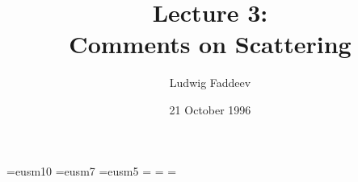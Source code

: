 
\font\teneusm=eusm10  \font\seveneusm=eusm7 
\font\fiveeusm=eusm5 
\newfam\eusmfam 
\textfont\eusmfam=\teneusm 
\scriptfont\eusmfam=\seveneusm 
\scriptscriptfont\eusmfam=\fiveeusm 
\def\Scr#1{{\fam\eusmfam\relax#1}}

\newcommand{\ScrA}{{\Scr A}} \newcommand{\ScrB}{{\Scr B}}
\newcommand{\ScrC}{{\Scr C}} \newcommand{\ScrD}{{\Scr D}}
\newcommand{\ScrE}{{\Scr E}} \newcommand{\ScrF}{{\Scr F}}
\newcommand{\ScrG}{{\Scr G}} \newcommand{\ScrH}{{\Scr H}}
\newcommand{\ScrI}{{\Scr I}} \newcommand{\ScrJ}{{\Scr J}}
\newcommand{\ScrK}{{\Scr K}} \newcommand{\ScrL}{{\Scr L}}
\newcommand{\ScrM}{{\Scr M}} \newcommand{\ScrN}{{\Scr N}}
\newcommand{\ScrO}{{\Scr O}} \newcommand{\ScrP}{{\Scr P}}
\newcommand{\ScrQ}{{\Scr Q}} \newcommand{\ScrR}{{\Scr R}}
\newcommand{\ScrS}{{\Scr S}} \newcommand{\ScrT}{{\Scr T}}
\newcommand{\ScrU}{{\Scr U}} \newcommand{\ScrV}{{\Scr V}}
\newcommand{\ScrW}{{\Scr W}} \newcommand{\ScrX}{{\Scr X}}
\newcommand{\ScrY}{{\Scr Y}} \newcommand{\ScrZ}{{\Scr Z}}


\newcommand{\grA}{{\frak A}}



\def\eps{\varepsilon}

\setlength{\textwidth}{6.5in}
\setlength{\textheight}{9.1in}
\setlength{\evensidemargin}{0in}
\setlength{\oddsidemargin}{0in}
\setlength{\topmargin}{-.75in}
\setlength{\parskip}{0.3\baselineskip}


\newcommand{\Le}{{{\mathchoice{\,{\scriptstyle\le}\,}
  {\,{\scriptstyle\le}\,}
  {\,{\scriptscriptstyle\le}\,}{\,{\scriptscriptstyle\le}\,}}}}
\newcommand{\Ge}{{{\mathchoice{\,{\scriptstyle\ge}\,}
  {\,{\scriptstyle\ge}\,}
  {\,{\scriptscriptstyle\ge}\,}{\,{\scriptscriptstyle\ge}\,}}}}




\nc{\bra}{  < }
\nc{\ket}{ > }
\nc{\triang}{ { \bigtriangleup} }

\nc{\hatastar}{{ \hat{\astar} }}



\title{Lecture 3:\\
Comments on Scattering}
\author{Ludwig Faddeev}
\date{21  October 1996}

